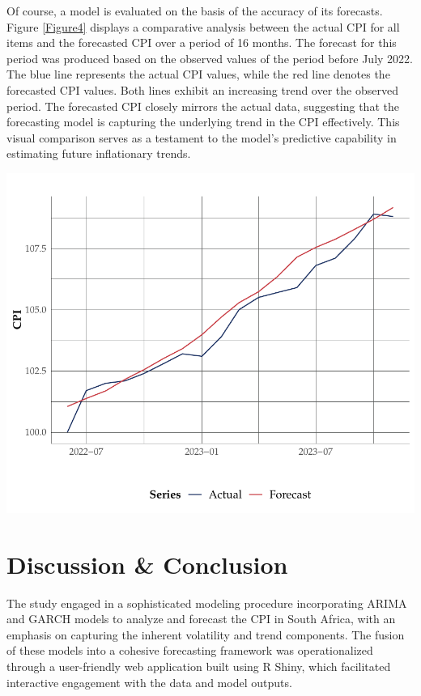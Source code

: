 \documentclass[11pt,preprint, authoryear]{elsarticle}
\let\origfigure\figure
\let\endorigfigure\endfigure
\renewenvironment{figure}[1][2] {
    \expandafter\origfigure\expandafter[H]
} {
    \endorigfigure
}
\numberwithin{equation}{section}
\numberwithin{figure}{section}
\numberwithin{table}{section}
\begin{document}
Of course, a model is evaluated on the basis of the accuracy of its
forecasts. Figure \ref{Figure4} displays a comparative analysis between
the actual CPI for all items and the forecasted CPI over a period of 16
months. The forecast for this period was produced based on the observed
values of the period before July 2022. The blue line represents the
actual CPI values, while the red line denotes the forecasted CPI values.
Both lines exhibit an increasing trend over the observed period. The
forecasted CPI closely mirrors the actual data, suggesting that the
forecasting model is capturing the underlying trend in the CPI
effectively. This visual comparison serves as a testament to the model's
predictive capability in estimating future inflationary trends.

\begin{figure}
\centering
\includegraphics{FMX-Proj-Write_Up_files/figure-latex/evaluation-1.pdf}
\caption{Forecasted change in CPI (with 95\% Confidence Intervals)
\label{Figure4}}
\end{figure}

\hypertarget{discussion-conclusion}{%
\section{Discussion \& Conclusion}\label{discussion-conclusion}}

The study engaged in a sophisticated modeling procedure incorporating
ARIMA and GARCH models to analyze and forecast the CPI in South Africa,
with an emphasis on capturing the inherent volatility and trend
components. The fusion of these models into a cohesive forecasting
framework was operationalized through a user-friendly web application
built using R Shiny, which facilitated interactive engagement with the
data and model outputs.
\end{document}
